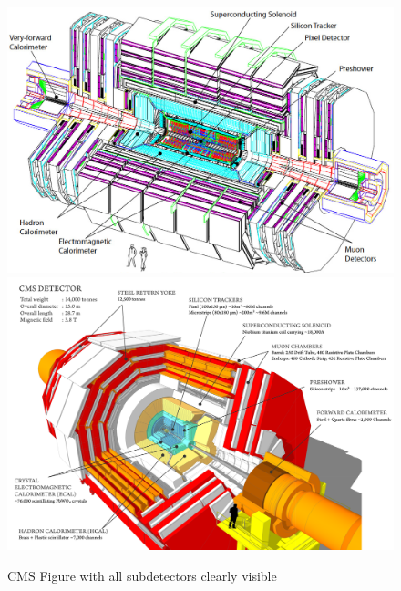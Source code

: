 \begin{figure}[h!t]
 \centering
 \includegraphics[width = 0.8 \textwidth]{Chapters/Chapter2_CERN/Figures/cms.png} \\ %
 \includegraphics[width = 0.8 \textwidth]{Chapters/Chapter2_CERN/Figures/cms_MuchText.png}%
 \caption{CMS Figure with all subdetectors clearly visible} \label{fig::CMSFig}
\end{figure}

